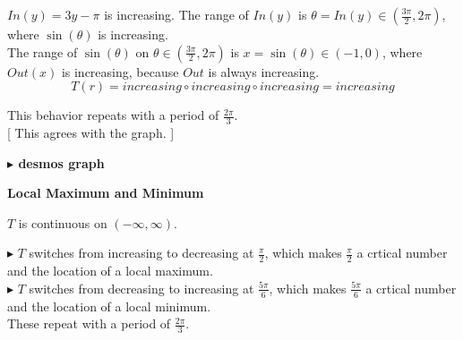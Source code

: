 \documentclass{ximera}
\begin{document}
$In(y) = 3y - \pi$ is increasing.  The range of $In(y)$ is $\theta = In(y) \in \left( \frac{3\pi}{2}, 2\pi \right)$, where $\sin(\theta)$ is increasing. \\



The range of $\sin(\theta)$ on $\theta \in \left( \frac{3\pi}{2}, 2\pi \right)$ is $x = \sin(\theta) \in (-1, 0)$, where $Out(x)$ is increasing, because $Out$ is always increasing. \\


\[
T(r) = increasing \circ increasing \circ increasing = increasing
\]







This behavior repeats with a period of $\frac{2\pi}{3}$. \\



[ This agrees with the graph. ]





\textbf{\textcolor{blue!55!black}{$\blacktriangleright$ desmos graph}} 
\begin{center}
\end{center}



















\textbf{\textcolor{blue!55!black}{Local Maximum and Minimum}}



$T$ is continuous on $(-\infty, \infty)$.


$\blacktriangleright$ $T$ switches from increasing to decreasing at $\frac{\pi}{2}$, which makes $\frac{\pi}{2}$ a crtical number and the location of a local maximum. \\




$\blacktriangleright$ $T$ switches from decreasing to increasing at $\frac{5\pi}{6}$, which makes $\frac{5\pi}{6}$ a crtical number and the location of a local minimum. \\


These repeat with a period of $\frac{2\pi}{3}$. \\
\end{document}
